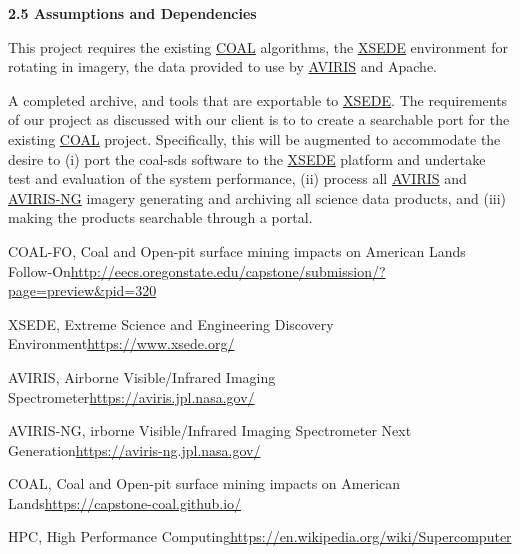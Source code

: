 \documentclass[a4paper,12pt]{article}
\begin{document}
\noindent \textbf{2.5 Assumptions and Dependencies}\newline


\noindent This project requires the existing \href{https://capstone-coal.github.io/}{COAL} algorithms, the \href{https://www.xsede.org/}{XSEDE} environment for rotating in imagery, the data provided to use by \href{https://aviris.jpl.nasa.gov/}{AVIRIS} and Apache.\newline


\newline


\noindent A completed archive, and tools that are exportable to \href{https://www.xsede.org/}{XSEDE}. The requirements of our project as discussed with our client is to to create a searchable port for the existing \href{https://capstone-coal.github.io/}{COAL} project. Specifically, this will be augmented to accommodate the desire to (i) port the coal-sds software to the \href{https://www.xsede.org/}{XSEDE} platform and undertake test and evaluation of the system performance, (ii) process all \href{https://aviris.jpl.nasa.gov/}{AVIRIS} and \href{https://aviris-ng.jpl.nasa.gov/}{AVIRIS-NG} imagery generating and archiving all science data products, and (iii) making the products searchable through a portal.\newline

\newline

\noindent [1] COAL-FO, Coal and Open-pit surface mining impacts on American Lands Follow-On\newline \url{http://eecs.oregonstate.edu/capstone/submission/?page=preview\&pid=320} \newline

\noindent [2] XSEDE, Extreme Science and Engineering Discovery Environment\newline \url{https://www.xsede.org/} \newline

\noindent [3] AVIRIS, Airborne Visible/Infrared Imaging Spectrometer\newline \url{https://aviris.jpl.nasa.gov/} \newline

\noindent [4] AVIRIS-NG, irborne Visible/Infrared Imaging Spectrometer Next Generation\newline \url{https://aviris-ng.jpl.nasa.gov/}\newline

\noindent [5] COAL, Coal and Open-pit surface mining impacts on American Lands\newline \url{https://capstone-coal.github.io/} \newline

\noindent [6] HPC, High Performance Computing\newline \url{https://en.wikipedia.org/wiki/Supercomputer}
\end{document}
